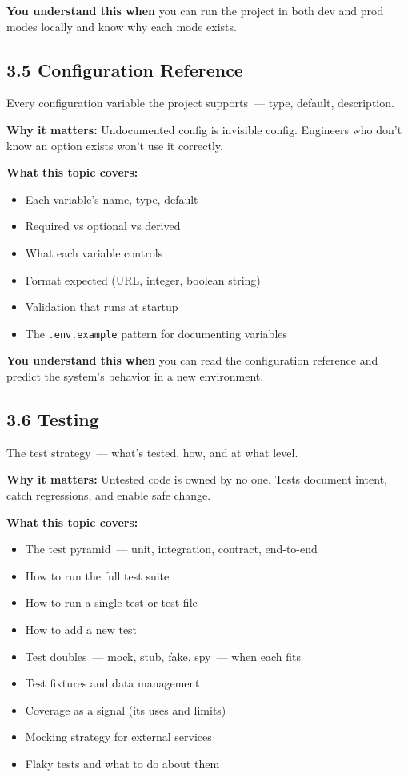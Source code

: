 \noindent{}\textbf{You understand this when} you can run the project in both dev and prod modes locally and know why each mode exists.

\subsection*{3.5 Configuration Reference}\label{project-planning-guide:35-configuration-reference}

Every configuration variable the project supports~--- type, default, description.

\textbf{Why it matters:} Undocumented config is invisible config. Engineers who don't know an option exists won't use it correctly.

\textbf{What this topic covers:}

\begin{itemize}
\tightlist
\item
  Each variable's name, type, default
\item
  Required vs optional vs derived
\item
  What each variable controls
\item
  Format expected (URL, integer, boolean string)
\item
  Validation that runs at startup
\item
  The \texttt{.env.example} pattern for documenting variables
\end{itemize}

\noindent{}\textbf{You understand this when} you can read the configuration reference and predict the system's behavior in a new environment.

\subsection*{3.6 Testing}\label{project-planning-guide:36-testing}

The test strategy~--- what's tested, how, and at what level.

\textbf{Why it matters:} Untested code is owned by no one. Tests document intent, catch regressions, and enable safe change.

\textbf{What this topic covers:}

\begin{itemize}
\tightlist
\item
  The test pyramid~--- unit, integration, contract, end-to-end
\item
  How to run the full test suite
\item
  How to run a single test or test file
\item
  How to add a new test
\item
  Test doubles~--- mock, stub, fake, spy~--- when each fits
\item
  Test fixtures and data management
\item
  Coverage as a signal (its uses and limits)
\item
  Mocking strategy for external services
\item
  Flaky tests and what to do about them
\end{itemize}

